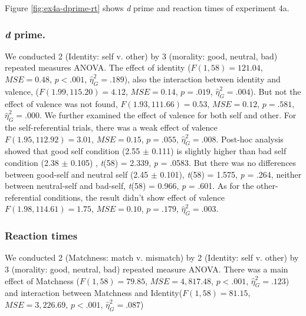 \documentclass[
  english,
  man]{apa6}
\begin{document}
Figure \ref{fig:ex4a-dprime-rt} shows \emph{d} prime and reaction times of experiment 4a.

\hypertarget{d-prime.-1}{%
\subsubsection{\texorpdfstring{\emph{d} prime.}{d prime.}}\label{d-prime.-1}}

We conducted 2 (Identity: self v. other) by 3 (morality: good, neutral, bad) repeated measures ANOVA. The effect of identity (\(F(1, 58) = 121.04\), \(\mathit{MSE} = 0.48\), \(p < .001\), \(\hat{\eta}^2_G = .189\)), also the interaction between identity and valence, (\(F(1.99, 115.20) = 4.12\), \(\mathit{MSE} = 0.14\), \(p = .019\), \(\hat{\eta}^2_G = .004\)). But not the effect of valence was not found, \(F(1.93, 111.66) = 0.53\), \(\mathit{MSE} = 0.12\), \(p = .581\), \(\hat{\eta}^2_G = .000\). We further examined the effect of valence for both self and other. For the self-referential trials, there was a weak effect of valence \(F(1.95, 112.92) = 3.01\), \(\mathit{MSE} = 0.15\), \(p = .055\), \(\hat{\eta}^2_G = .008\). Post-hoc analysis showed that good self condition (2.55 \(\pm\) 0.111) is slightly higher than bad self condition (2.38 \(\pm\) 0.105) , \emph{t}(58) = 2.339, \emph{p} = .0583. But there was no differences between good-self and neutral self (2.45 \(\pm\) 0.101), \emph{t}(58) = 1.575, \emph{p} = .264, neither between neutral-self and bad-self, \emph{t}(58) = 0.966, \emph{p} = .601. As for the other-referential conditions, the result didn't show effect of valence \(F(1.98, 114.61) = 1.75\), \(\mathit{MSE} = 0.10\), \(p = .179\), \(\hat{\eta}^2_G = .003\).

\hypertarget{reaction-times-2}{%
\subsubsection{Reaction times}\label{reaction-times-2}}

We conducted 2 (Matchness: match v. mismatch) by 2 (Identity: self v. other) by 3 (morality: good, neutral, bad) repeated measure ANOVA. There was a main effect of Matchness (\(F(1, 58) = 79.85\), \(\mathit{MSE} = 4,817.48\), \(p < .001\), \(\hat{\eta}^2_G = .123\)) and interaction between Matchness and Identity(\(F(1, 58) = 81.15\), \(\mathit{MSE} = 3,226.69\), \(p < .001\), \(\hat{\eta}^2_G = .087\))
\end{document}
